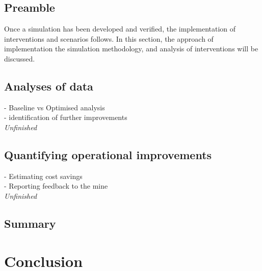 	\subsection{Preamble}
		Once a simulation has been developed and verified, the implementation of interventions and scenarios follows. In this section, the approach of implementation the simulation methodology, and analysis of interventions will be discussed.
	\subsection{Analyses of data}
		- Baseline vs Optimised analysis \\
		- identification of further improvements\\
		\textit{Unfinished}
	
	\subsection{Quantifying operational improvements}
		- Estimating cost savings \\
		- Reporting feedback to the mine\\
		\textit{Unfinished}
	\subsection{Summary}
\section{Conclusion}
